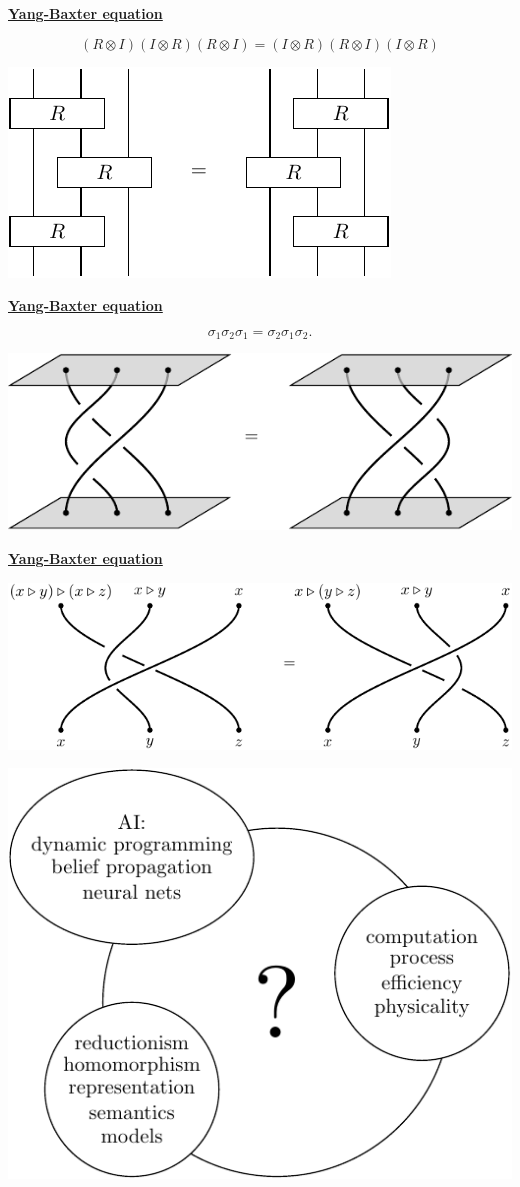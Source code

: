 \documentclass[11pt]{article}
\def\heading #1{\centerline{\underline{\bf\LARGE #1}}}
\def\vsp {\vskip 0.5cm}
\def\tensor{\otimes}
\begin{document}
\newpage %

\heading{Yang-Baxter equation}
\vsp

$$(R\tensor I) (I\tensor R) (R\tensor I) = (I\tensor R) (R\tensor I) (I\tensor R)$$
\vsp
\centerline{\includegraphics[]{pic-yb.pdf}}


\newpage %

\heading{Yang-Baxter equation}
\vsp
$$\sigma_1 \sigma_2 \sigma_1 = \sigma_2 \sigma_1 \sigma_2.$$
\vsp
\centerline{\includegraphics[]{pic-braid.pdf}}


\newpage %

\heading{Yang-Baxter equation}
\vsp
\centerline{\includegraphics[]{pic-braid-shelf.pdf}}

\newpage %

\centerline{\includegraphics[]{pic-question.pdf}}
\end{document}
